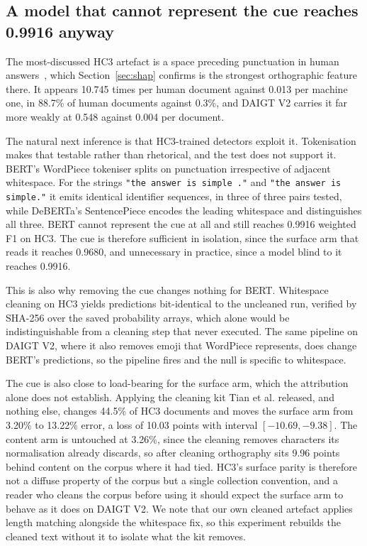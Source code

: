 \documentclass[conference,a4paper]{IEEEtran}
\begin{document}
\subsection{A model that cannot represent the cue reaches 0.9916 anyway}
\label{sec:tokenisation}

The most-discussed HC3 artefact is a space preceding punctuation in human answers~\cite{Tian2023multiscale}, which Section~\ref{sec:shap} confirms is the strongest orthographic feature there. It appears 10.745 times per human document against 0.013 per machine one, in 88.7\% of human documents against 0.3\%, and DAIGT V2 carries it far more weakly at 0.548 against 0.004 per document.

The natural next inference is that HC3-trained detectors exploit it. Tokenisation makes that testable rather than rhetorical, and the test does not support it. BERT's WordPiece tokeniser splits on punctuation irrespective of adjacent whitespace. For the strings \texttt{"the answer is simple ."} and \texttt{"the answer is simple."} it emits identical identifier sequences, in three of three pairs tested, while DeBERTa's SentencePiece encodes the leading whitespace and distinguishes all three. BERT cannot represent the cue at all and still reaches 0.9916 weighted F1 on HC3. The cue is therefore sufficient in isolation, since the surface arm that reads it reaches 0.9680, and unnecessary in practice, since a model blind to it reaches 0.9916.

This is also why removing the cue changes nothing for BERT. Whitespace cleaning on HC3 yields predictions bit-identical to the uncleaned run, verified by SHA-256 over the saved probability arrays, which alone would be indistinguishable from a cleaning step that never executed. The same pipeline on DAIGT V2, where it also removes emoji that WordPiece represents, does change BERT's predictions, so the pipeline fires and the null is specific to whitespace.

The cue is also close to load-bearing for the surface arm, which the attribution alone does not establish. Applying the cleaning kit Tian et al. released, and nothing else, changes 44.5\% of HC3 documents and moves the surface arm from 3.20\% to 13.22\% error, a loss of 10.03 points with interval $[-10.69, -9.38]$. The content arm is untouched at 3.26\%, since the cleaning removes characters its normalisation already discards, so after cleaning orthography sits 9.96 points behind content on the corpus where it had tied. HC3's surface parity is therefore not a diffuse property of the corpus but a single collection convention, and a reader who cleans the corpus before using it should expect the surface arm to behave as it does on DAIGT V2. We note that our own cleaned artefact applies length matching alongside the whitespace fix, so this experiment rebuilds the cleaned text without it to isolate what the kit removes.
\end{document}
